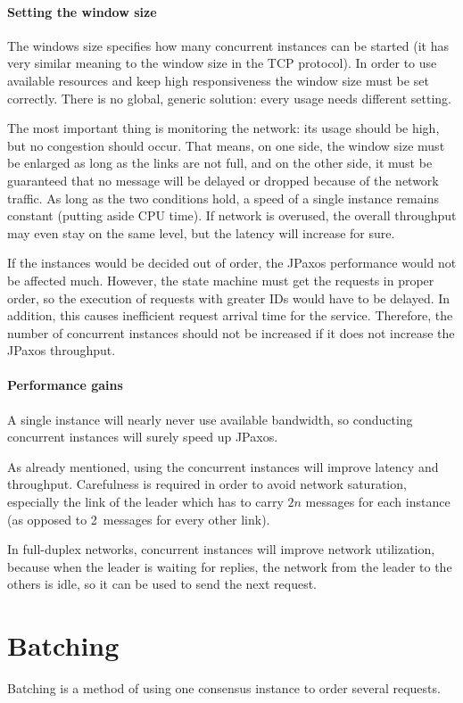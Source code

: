 \paragraph{Setting the window size}
The windows size specifies how many concurrent instances can be started (it has very similar meaning to the window size in the TCP protocol). In order to use available resources and keep high responsiveness the window size must be set correctly. There is no global, generic solution: every usage needs different setting.

The most important thing is monitoring the network: its usage should be high, but no congestion should occur.
That means, on one side, the window size must be enlarged as long as the links are not full, and on the other side, it must be guaranteed that no message will be delayed or dropped because of the network traffic. As long as the two conditions hold, a speed of a single instance remains constant (putting aside CPU time).
If network is overused, the overall throughput may even stay on the same level, but the latency will increase for sure.

If the instances would be decided out of order, the JPaxos performance would not be affected much. However, the state machine must get the requests in proper order, so the execution of requests with greater IDs would have to be delayed. In addition, this causes inefficient request arrival time for the service. Therefore, the number of concurrent instances should not be increased if it does not increase the JPaxos throughput.

\paragraph{Performance gains}
A single instance will nearly never use available bandwidth, so conducting concurrent instances will surely speed up JPaxos.

As already mentioned, using the concurrent instances will improve latency and throughput. Carefulness is required in order to avoid network saturation, especially the link of the leader which has to carry $2n$ messages for each instance (as opposed to 2~messages for every other link).

In full-duplex networks, concurrent instances will improve network utilization, because when the leader is waiting for replies, the network from the leader to the others is idle, so it can be used to send the next request. 

\section{Batching}
\label{sec:batching}
Batching is a method of using one consensus instance to order several requests.

